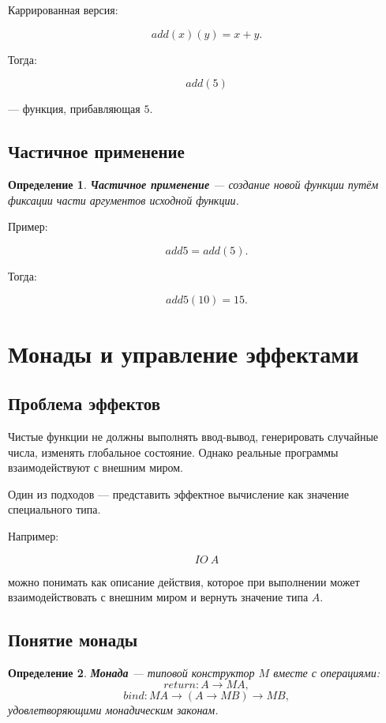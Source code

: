 \documentclass[12pt,a4paper]{article}
\newtheorem{definition}{Определение}
\begin{document}
Каррированная версия:

\[
add(x)(y)=x+y.
\]

Тогда:

\[
add(5)
\]

--- функция, прибавляющая $5$.

\subsection{Частичное применение}

\begin{definition}
\textbf{Частичное применение} --- создание новой функции путём фиксации части аргументов исходной функции.
\end{definition}

Пример:

\[
add5 = add(5).
\]

Тогда:

\[
add5(10) = 15.
\]

\section{Монады и управление эффектами}

\subsection{Проблема эффектов}

Чистые функции не должны выполнять ввод-вывод, генерировать случайные числа, изменять глобальное состояние. Однако реальные программы взаимодействуют с внешним миром.

Один из подходов --- представить эффектное вычисление как значение специального типа.

Например:

\[
IO\ A
\]

можно понимать как описание действия, которое при выполнении может взаимодействовать с внешним миром и вернуть значение типа $A$.

\subsection{Понятие монады}

\begin{definition}
\textbf{Монада} --- типовой конструктор $M$ вместе с операциями:
\[
return : A \to M A,
\]
\[
bind : M A \to (A \to M B) \to M B,
\]
удовлетворяющими монадическим законам.
\end{definition}
\end{document}
